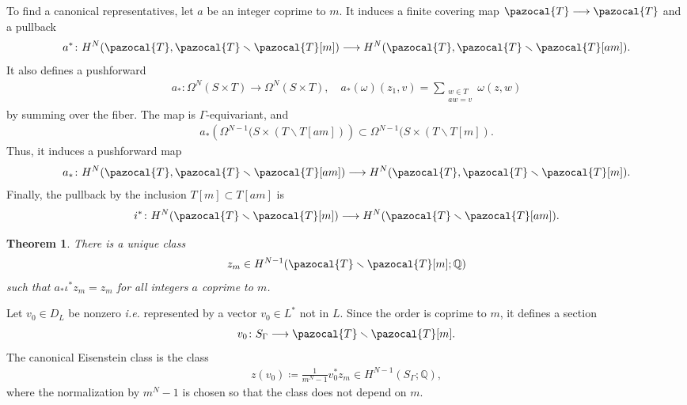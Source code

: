 \documentclass[a4paper,11pt]{amsart} %
\newcommand{\8}{\infty}
\newcommand{\Q}{\mathbb{Q}}
\newcommand{\Tcal}{\pazocal{T}}
\theoremstyle{mytheoremstyle}
\newtheorem{thm}{Theorem}[section]
\theoremstyle{remark}
\numberwithin{equation}{section}
\begin{document}
To find a canonical representatives, let $a$ be an integer coprime to $m$. It induces a finite covering map $\Tcal \longrightarrow \Tcal$ and a pullback 
\begin{align}
a^\ast \colon H^N(\Tcal,\Tcal\smallsetminus\Tcal[m]) \longrightarrow H^N (\Tcal,\Tcal \smallsetminus \Tcal[am]).
\end{align} It also defines a pushforward
\begin{align}
a_\ast \colon \Omega^N(S \times T) \longrightarrow \Omega^N(S \times T), \quad a_\ast(\omega)(z_1,v) =\sum_{\substack{w \in T \\ aw=v}} \omega(z,w)
\end{align}
by summing over the fiber. The map is $\Gamma$-equivariant, and
\begin{align}
a_\ast \left ( \Omega^{N-1}(S \times (T\smallsetminus T[am])\right ) \subset \Omega^{N-1}(S \times (T\smallsetminus T[m]).
\end{align}  Thus, it induces a pushforward map
\begin{align}
a_\ast \colon H^N(\Tcal,\Tcal \smallsetminus \Tcal[am]) \longrightarrow H^N(\Tcal,\Tcal \smallsetminus \Tcal[m]).
\end{align}
Finally, the pullback by the inclusion $T[m]\subset T[am]$ is
\begin{align}
i^\ast \colon H^N(\Tcal \smallsetminus \Tcal[m]) \longrightarrow H^N(\Tcal \smallsetminus \Tcal[am]).
\end{align} 
\begin{thm}\cite[Section.~3]{bcg}There is a unique class 
\begin{align}
z_m \in H^{N-1}(\Tcal\smallsetminus \Tcal[m];\Q)
\end{align} such that $a_\ast \iota^\ast z_m=z_m$ for all integers $a$ coprime to $m$.
\end{thm}
Let $v_0 \in D_L$ be nonzero {\em i.e.} represented by a vector $v_0 \in L^\ast$ not in $L$. Since the order is coprime to $m$, it defines a section  
\begin{align}
v_0 \colon S_\Gamma \longrightarrow \Tcal \smallsetminus \Tcal[m].
\end{align}
The canonical Eisenstein class is the class
\begin{align}
z(v_0) \coloneqq \frac{1}{m^N-1}v_0^\ast z_m \in H^{N-1}(S_\Gamma;\Q),
\end{align}
where the normalization by $m^N-1$ is chosen so that the class does not depend on $m$.
\end{document}
